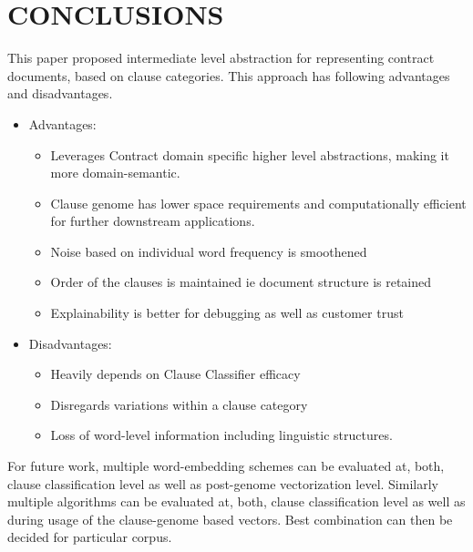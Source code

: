 \documentclass[9pt,academicons]{article}
\begin{document}


\section{CONCLUSIONS}

This paper proposed intermediate level abstraction for representing contract documents, based on clause categories. This approach has following advantages and disadvantages.

 \begin{itemize}
 \item Advantages:
  \begin{itemize}
\item Leverages Contract domain specific higher level abstractions, making it more domain-semantic.
\item Clause genome has lower space requirements and computationally efficient for further downstream applications.
\item Noise based on individual word frequency is smoothened
\item Order of the clauses is maintained ie document structure is retained
\item Explainability is better for debugging as well as customer trust
\end{itemize}
\item Disadvantages:
 \begin{itemize}
\item Heavily depends on Clause Classifier efficacy
\item Disregards variations within a clause category
\item Loss of word-level information including linguistic structures.
\end{itemize}
\end{itemize}

For future work, multiple word-embedding schemes can be evaluated at, both, clause classification level as well as post-genome vectorization level. Similarly multiple algorithms can be evaluated at, both, clause classification level as well as during usage of the clause-genome based vectors. Best combination can then be decided for particular corpus.
%








\bigskip
\end{document}
